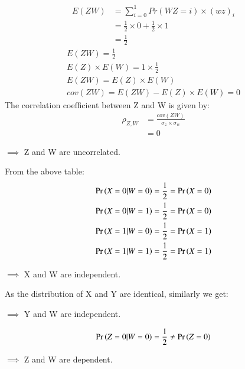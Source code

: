\documentclass[journal,12pt,twocolumn]{IEEEtran}
\theoremstyle{definition}
\begin{document}
\begin{align}
E(ZW) &= \sum_{i = 0}^{1} Pr(WZ=i) \times (wz)_{i}\\
&= \frac{1}{2} \times 0 + \frac{1}{2} \times 1\\
&= \frac{1}{2}
\end{align}
\begin{align}
    E(ZW) = \frac{1}{2}\\
    E(Z)\times E(W) = 1 \times \frac{1}{2}\\
    E(ZW) = E(Z)\times E(W)\\
    cov(ZW) = E(ZW) - E(Z)\times E(W) = 0 
\end{align}
    The correlation coefficient between Z and W is given by:
\begin{align}
\rho_{Z,W} &= \frac{cov(ZW)}{\sigma_z\times \sigma_w}\\
&= 0
\end{align}
\begin{center}
   $\implies$ Z and W are uncorrelated.
\end{center}
From the above table:
\begin{align}
    \Pr\left(X = 0 | W = 0\right) = \frac{1}{2} = \Pr\left(X = 0\right)\\
    \Pr\left(X = 0 | W = 1\right) = \frac{1}{2} = \Pr\left(X = 0\right)\\
    \Pr\left(X = 1 | W = 0\right) = \frac{1}{2} = \Pr\left(X = 1\right)\\
    \Pr\left(X = 1 | W = 1\right) = \frac{1}{2} = \Pr\left(X = 1\right)
\end{align}
\begin{center}
   $\implies$ X and W are independent. 
\end{center}
As the distribution of X and Y are identical, similarly we get:
\begin{center}
   $\implies$ Y and W are independent. 
\end{center}
\begin{align}
    \Pr\left(Z = 0 | W = 0\right) = \frac{1}{2} \neq \Pr\left(Z = 0\right)
\end{align}
\begin{center}
   $\implies$ Z and W are dependent. 
\end{center}
\bigskip
{}
\end{document}

